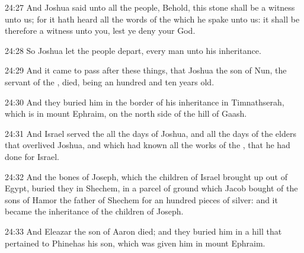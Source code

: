 24:27 And Joshua said unto all the people, Behold, this stone shall be
a witness unto us; for it hath heard all the words of the \LORD which
he spake unto us: it shall be therefore a witness unto you, lest ye
deny your God.

24:28 So Joshua let the people depart, every man unto his inheritance.

24:29 And it came to pass after these things, that Joshua the son of
Nun, the servant of the \LORD, died, being an hundred and ten years
old.

24:30 And they buried him in the border of his inheritance in
Timnathserah, which is in mount Ephraim, on the north side of the hill
of Gaash.

24:31 And Israel served the \LORD all the days of Joshua, and all the
days of the elders that overlived Joshua, and which had known all the
works of the \LORD, that he had done for Israel.

24:32 And the bones of Joseph, which the children of Israel brought up
out of Egypt, buried they in Shechem, in a parcel of ground which
Jacob bought of the sons of Hamor the father of Shechem for an hundred
pieces of silver: and it became the inheritance of the children of
Joseph.

24:33 And Eleazar the son of Aaron died; and they buried him in a hill
that pertained to Phinehas his son, which was given him in mount
Ephraim.

